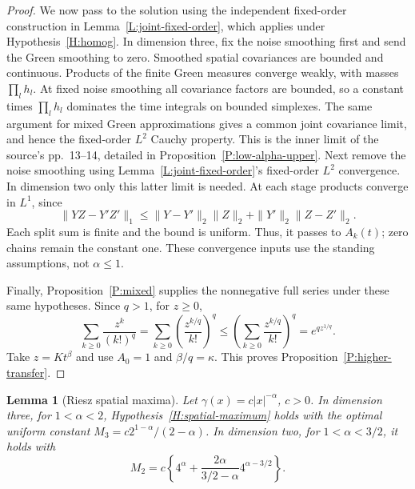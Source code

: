 \documentclass[12pt]{article}
\numberwithin{equation}{section}
\newtheorem{lemma}[theorem]{Lemma}
\theoremstyle{definition}
\begin{document}
\begin{proof}
  We now pass to the solution using the independent fixed-order
  construction in Lemma~\ref{L:joint-fixed-order}, which applies under
  Hypothesis~\ref{H:homog}. In dimension
  three, fix the noise smoothing first and send the Green smoothing
  to zero. Smoothed spatial covariances are bounded and continuous.
  Products of the finite Green measures converge weakly, with masses
  $\prod_lh_l$. At fixed noise smoothing all covariance factors are
  bounded, so a constant times $\prod_lh_l$ dominates the time
  integrals on bounded simplexes. The same argument for mixed Green
  approximations gives a common joint covariance limit, and hence the
  fixed-order $L^2$ Cauchy property. This is the inner limit of the
  source's pp.~13--14, detailed in Proposition~\ref{P:low-alpha-upper}.
  Next remove the noise smoothing using Lemma~\ref{L:joint-fixed-order}'s
  fixed-order $L^2$ convergence. In dimension two only this latter limit is needed.
  At each stage products converge in $L^1$, since
  \[
    \|YZ-Y'Z'\|_1
    \le\|Y-Y'\|_2\|Z\|_2+\|Y'\|_2\|Z-Z'\|_2.
  \]
  Each split sum is finite and the bound is uniform. Thus, it passes
  to $A_k(t)$; zero chains remain the constant one. These convergence
  inputs use the standing assumptions, not $\alpha\le1$.

  Finally, Proposition~\ref{P:mixed} supplies the nonnegative full
  series under these same hypotheses. Since $q>1$, for $z\ge0$,
  \[
    \sum_{k\ge0}\frac{z^k}{(k!)^q}
    =\sum_{k\ge0}\left(\frac{z^{k/q}}{k!}\right)^q
    \le\left(\sum_{k\ge0}\frac{z^{k/q}}{k!}\right)^q
    =e^{qz^{1/q}}.
  \]
  Take $z=Kt^\beta$ and use $A_0=1$ and $\beta/q=\kappa$.
  This proves Proposition~\ref{P:higher-transfer}.
\end{proof}

\begin{lemma}[Riesz spatial maxima]\label{L:higher-riesz}
  Let $\gamma(x)=c|x|^{-\alpha}$, $c>0$. In dimension three, for
  $1<\alpha<2$, Hypothesis~\ref{H:spatial-maximum} holds with the
  optimal uniform constant $M_3=c2^{1-\alpha}/(2-\alpha)$.
  In dimension two, for $1<\alpha<3/2$, it holds with
  \[
    M_2=c\left\{4^\alpha+
    \frac{2\alpha}{3/2-\alpha}4^{\alpha-3/2}\right\}.
  \]
\end{lemma}
\end{document}
